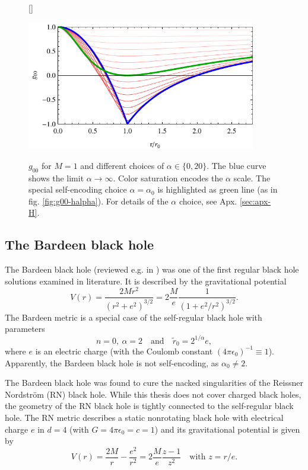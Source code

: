 \documentclass[12pt,a4paper]{report}
\numberwithin{equation}{chapter}
\begin{document}
\begin{figure}
[\FBwidth]{%
\caption[Metric plot of the self-regular limit $\alpha\to\infty$]{$g_{00}$ for $M=1$ and different choices of $\alpha\in\{0,20\}$. The blue curve shows the limit $\alpha\to \infty$. Color saturation encodes the $\alpha$ scale. The special self-encoding choice $\alpha=\alpha_0$ is highlighted as green line (as in fig. \ref{fig:g00-halpha}). For details of the $\alpha$ choice, see Apx. \ref{sec:apx-H}.}\label{fig:g00-alpha-inf}
}{\includegraphics[width=10cm]{figures/limit-halpha-plot.pdf}}
\end{figure}

\clearpage
\subsection{The Bardeen black hole}
The Bardeen black hole (reviewed e.g. in \cite{Ansoldi2008}) was one of the first regular black hole solutions examined in literature. It is described by the gravitational potential
\begin{equation}
V(r) = \frac{2 M r^2}{(r^2 + e^2)^{3/2}}
= 2 \frac{M}{e} \frac{1}{(1 + e^2 / r^2)^{3/2}}.
\end{equation}
The Bardeen metric is a special case of the self-regular black hole with parameters
\begin{equation}
n=0,~ \alpha=2 \quad \text{and} \quad \tilde r_0= 2^{1/\alpha} e,
\end{equation}
where $e$ is an electric charge (with the Coulomb constant $(4\pi\epsilon_0)^{-1} \equiv 1$). Apparently, the Bardeen black hole is not self-encoding, as $\alpha_0 \neq 2$.

The Bardeen black hole was found to cure the nacked singularities of the Reissner Nordström (RN) black hole. While this thesis does not cover charged black holes, the geometry of the RN black hole is tightly connected to the self-regular black hole. The RN metric describes a static nonrotating black hole with electrical charge $e$ in $d=4$ (with $G=4\pi\epsilon_0=c=1$) and its gravitational potential is given by
\begin{equation}
V(r) = \frac{2M}{r} - \frac{e^2}{r^2}
= 2\frac{M}{e} \frac{z-1}{z^2}
\quad\text{with }z=r/e.
\end{equation}
\end{document}
